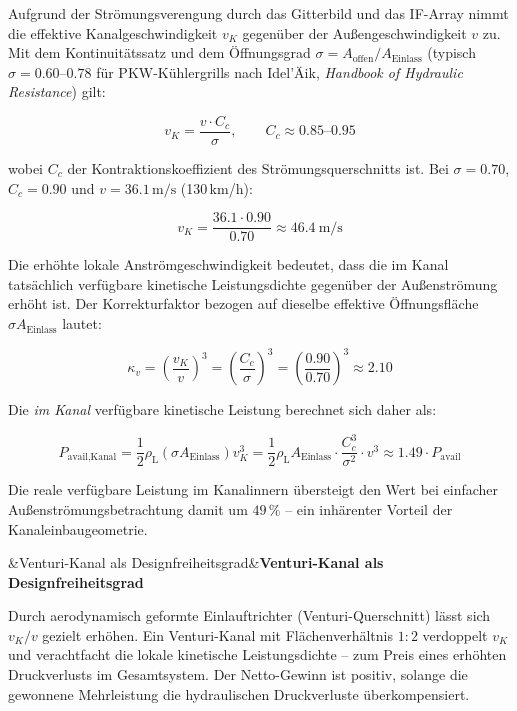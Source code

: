 ﻿\documentclass[12pt, a4paper]{report}
\newenvironment{hinweis}[1][]{%
  \begin{hinweisframe}\sloppy%
  \ifx&#1&\else\textbf{#1}\par\smallskip\fi}{\end{hinweisframe}}
\theoremstyle{definition}
\theoremstyle{remark}
\newcommand{\rhoL}{\rho_{\text{L}}}
\newcommand{\Aeinlass}{A_{\text{Einlass}}}
\begin{document}
Aufgrund der Strömungsverengung durch das Gitterbild und das IF-Array nimmt
die effektive Kanalgeschwindigkeit $v_K$ gegenüber der Außengeschwindigkeit $v$
zu. Mit dem Kontinuitätssatz und dem Öffnungsgrad $\sigma = A_{\text{offen}}/\Aeinlass$
(typisch $\sigma = 0.60$--$0.78$ für PKW-Kühlergrills nach Idel'Äik,
\emph{Handbook of Hydraulic Resistance}) gilt:

\begin{equation}
  v_K = \frac{v \cdot C_c}{\sigma}, \qquad C_c \approx 0.85\text{--}0.95
  \label{eq:v_kanal}
\end{equation}

wobei $C_c$ der Kontraktionskoeffizient des Strömungsquerschnitts ist.
Bei $\sigma = 0.70$, $C_c = 0.90$ und $v = 36.1\,\text{m/s}$ (130\,km/h):

\begin{equation}
  v_K = \frac{36.1 \cdot 0.90}{0.70} \approx \SI{46.4}{\metre\per\second}
  \label{eq:v_kanal_130}
\end{equation}

Die erhöhte lokale Anströmgeschwindigkeit bedeutet, dass die im Kanal tatsächlich
verfügbare kinetische Leistungsdichte gegenüber der Außenströmung erhöht ist.
Der Korrekturfaktor bezogen auf dieselbe effektive Öffnungsfläche
$\sigma \Aeinlass$ lautet:

\begin{equation}
  \kappa_v = \left(\frac{v_K}{v}\right)^3 = \left(\frac{C_c}{\sigma}\right)^3
           = \left(\frac{0.90}{0.70}\right)^3 \approx 2.10
  \label{eq:kappa_v}
\end{equation}

Die \emph{im Kanal} verfügbare kinetische Leistung berechnet sich daher als:

\begin{equation}
  P_{\text{avail,Kanal}} = \frac{1}{2}\rhoL (\sigma \Aeinlass) v_K^3
  = \frac{1}{2}\rhoL \Aeinlass \cdot \frac{C_c^3}{\sigma^2} \cdot v^3
  \approx 1.49 \cdot P_{\text{avail}}
  \label{eq:p_kanal_korr}
\end{equation}

Die reale verfügbare Leistung im Kanalinnern übersteigt den Wert bei einfacher
Außenströmungsbetrachtung damit um $49\,\%$ -- ein inhärenter Vorteil der
Kanaleinbaugeometrie.

\begin{hinweis}[Venturi-Kanal als Designfreiheitsgrad]
  Durch aerodynamisch geformte Einlauftrichter (Venturi-Querschnitt) lässt
  sich $v_K/v$ gezielt erhöhen. Ein Venturi-Kanal mit Flächenverhältnis $1:2$
  verdoppelt $v_K$ und verachtfacht die lokale kinetische Leistungsdichte --
  zum Preis eines erhöhten Druckverlusts im Gesamtsystem. Der Netto-Gewinn
  ist positiv, solange die gewonnene Mehrleistung die hydraulischen
  Druckverluste überkompensiert.
\end{hinweis}
\end{document}
